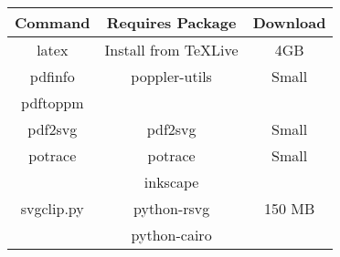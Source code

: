 \documentclass[14pt,fleqn]{extarticle}
\begin{document}
 
\begin{center}
  \begin{tabular}{ccc}
   \toprule
        Command & Requires Package & Download \\
   \midrule 
   latex & Install from \TeX Live & 4GB \\
   \midrule 
   pdfinfo & poppler-utils & Small \\
   pdftoppm & \\
    \midrule 
    pdf2svg & pdf2svg & Small \\
    \midrule 
    potrace & potrace & Small \\
    \midrule 
    & inkscape & \\
    svgclip.py & python-rsvg & 150 MB\\
    & python-cairo & \\
    \bottomrule
  \end{tabular}
\end{center}
\end{document}
